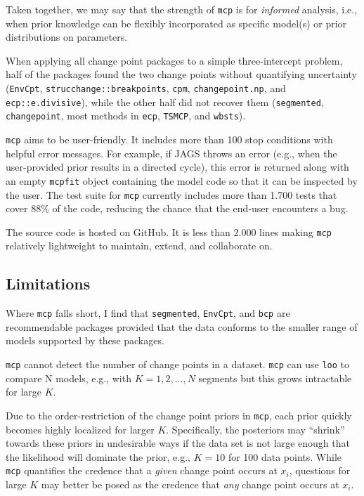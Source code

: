 \documentclass[
  american,
]{article}
\begin{document}
Taken together, we may say that the strength of \texttt{mcp} is for \emph{informed} analysis, i.e., when prior knowledge can be flexibly incorporated as specific model(s) or prior distributions on parameters.

When applying all change point packages to a simple three-intercept problem, half of the packages found the two change points without quantifying uncertainty (\texttt{EnvCpt}, \texttt{strucchange::breakpoints}, \texttt{cpm}, \texttt{changepoint.np}, and \texttt{ecp::e.divisive}), while the other half did not recover them (\texttt{segmented}, \texttt{changepoint}, most methods in \texttt{ecp}, \texttt{TSMCP}, and \texttt{wbsts}).

\texttt{mcp} aims to be user-friendly. It includes more than 100 stop conditions with helpful error messages. For example, if JAGS throws an error (e.g., when the user-provided prior results in a directed cycle), this error is returned along with an empty \texttt{mcpfit} object containing the model code so that it can be inspected by the user. The test suite for \texttt{mcp} currently includes more than 1.700 tests that cover 88\% of the code, reducing the chance that the end-user encounters a bug.

The source code is hosted on GitHub. It is less than 2.000 lines making \texttt{mcp} relatively lightweight to maintain, extend, and collaborate on.

\hypertarget{limitations}{%
\subsection{Limitations}\label{limitations}}

Where \texttt{mcp} falls short, I find that \texttt{segmented}, \texttt{EnvCpt}, and \texttt{bcp} are recommendable packages provided that the data conforms to the smaller range of models supported by these packages.

\texttt{mcp} cannot detect the number of change points in a dataset. \texttt{mcp} can use \texttt{loo} to compare N models, e.g., with \(K = 1, 2, \ldots, N\) segments but this grows intractable for large \(K\).

Due to the order-restriction of the change point priors in \texttt{mcp}, each prior quickly becomes highly localized for larger \(K\). Specifically, the posteriors may ``shrink'' towards these priors in undesirable ways if the data set is not large enough that the likelihood will dominate the prior, e.g., \(K = 10\) for 100 data points. While \texttt{mcp} quantifies the credence that a \emph{given} change point occurs at \(x_i\), questions for large \(K\) may better be posed as the credence that \emph{any} change point occurs at \(x_i\).
\end{document}
